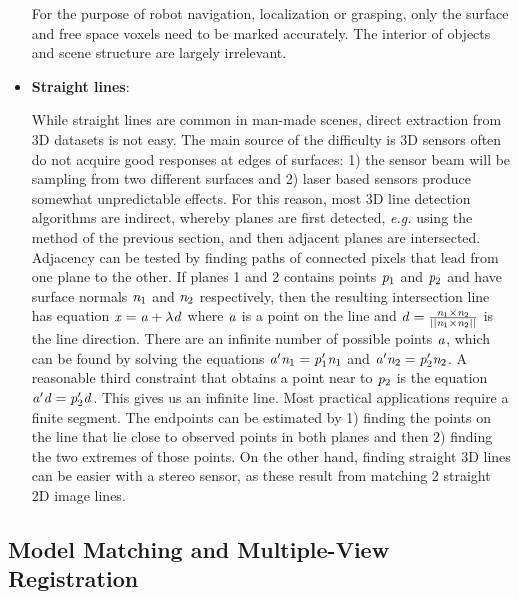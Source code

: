 \documentclass[twocolumn,oneside]{book}
\begin{document}
\begin{itemize}
For the purpose of robot navigation, localization or grasping, only the
surface and  free space voxels need to be marked accurately.
The interior of objects and scene structure are largely irrelevant.

\item {\bf Straight lines}: 

While straight lines are common in man-made scenes, direct extraction
from 3D datasets is not easy.
The main source of the difficulty is 3D sensors often do not acquire good
responses at edges of surfaces: 1) the sensor beam will be sampling from two
different surfaces and 2) laser based sensors produce somewhat unpredictable
effects.
For this reason, most 3D line detection algorithms are indirect,
whereby planes are first detected, {\it e.g.} using the method
of the previous section, and then adjacent planes are intersected.
Adjacency can be tested by finding paths of connected pixels that lead
from one plane to the other.
If planes 1 and 2 contains points ${\bf \it p}_1$ and ${\bf \it p}_2$ 
and have surface normals ${\bf \it n}_1$ and ${\bf \it n}_2$
respectively, then the resulting intersection line has equation
${\bf \it x} = {\bf \it a} + \lambda {\bf \it d}$ where 
${\bf \it a}$ is a point on the line and
${\bf \it d} = \frac{{\bf \it n}_1  \times {\bf \it n}_2}{\mid\mid {\bf \it n}_1  \times {\bf \it n}_2 \mid\mid}$ is the line direction.
There are an infinite number of possible points ${\bf \it a}$, which can be 
found by solving the equations 
${\bf \it a}'{\bf \it n}_1 = {\bf \it p}_1'{\bf \it n}_1$
and ${\bf \it a}'{\bf \it n}_2 = {\bf \it p}_2'{\bf \it n}_2$.
A reasonable third constraint that obtains a point near to ${\bf \it p}_2$ is
the equation ${\bf \it a}'{\bf \it d} = {\bf \it p}_2'{\bf \it d}$.
This gives us an infinite line.
Most practical applications require a finite segment.
The endpoints can be estimated by 1) finding the points on the line that
lie close to observed points in both planes and then 2) finding the two
extremes of those points.
On the other hand, finding straight 3D lines can be easier with a stereo 
sensor, as these result from matching 2 straight 2D image lines.

\end{itemize}

\subsection{Model Matching and Multiple-View Registration\label{match22}} 
\end{document}
